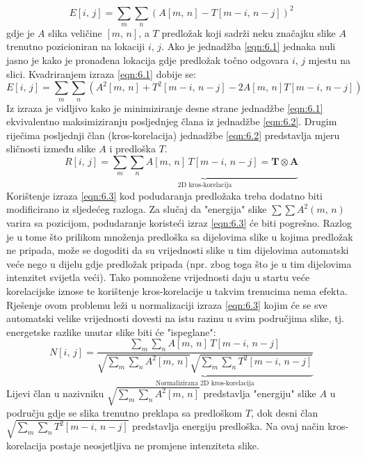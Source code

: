 \begin{equation}
	E[i,\, j] = \sum_{m}\sum_{n}\left(A[m,\, n]-T[m-i,\, n-j]\right)^{2}
	\label{eqn:6.1}
\end{equation}
gdje je $A$ slika veličine $[m,\, n]$, a $T$ predložak koji sadrži neku značajku slike $A$ trenutno pozicioniran na lokaciji $i,\, j$. Ako je jednadžba \ref{eqn:6.1} jednaka nuli jasno je kako je pronađena lokacija gdje predložak točno odgovara $i,\, j$ mjestu na slici. Kvadriranjem izraza \ref{eqn:6.1} dobije se:
\begin{equation}
	E[i,\, j] = \sum_{m}\sum_{n}\left(A^{2}[m,\, n]+T^{2}[m-i,\, n-j]-2A[m,\, n]T[m-i,\, n-j]\right)
	\label{eqn:6.2}
\end{equation}
Iz izraza je vidljivo kako je minimiziranje desne strane jednadžbe \ref{eqn:6.1} ekvivalentno maksimiziranju posljednjeg člana iz jednadžbe \ref{eqn:6.2}. Drugim riječima posljednji član (kros-korelacija) jednadžbe \ref{eqn:6.2}  predstavlja mjeru sličnosti između slike $A$ i predloška $T$.
\begin{equation}
	\boxed{R[i,\, j]=\underbrace{\sum_{m}\sum_{n}A[m,\, n]\, T[m-i,\, n-j] = \boldsymbol{T}\otimes \boldsymbol{A}}_{\text{2D kros-korelacija}}}
	\label{eqn:6.3}
\end{equation}
Korištenje izraza \ref{eqn:6.3} kod podudaranja predložaka treba dodatno biti modificirano iz sljedećeg razloga. Za slučaj da "energija" slike $\sum\sum A^{2}(m,\, n)$ varira sa pozicijom, podudaranje koristeći izraz \ref{eqn:6.3} će biti pogrešno. Razlog je u tome što prilikom množenja predloška sa dijelovima slike u kojima predložak ne pripada, može se dogoditi da su vrijednosti slike u tim dijelovima automatski veće nego u dijelu gdje predložak pripada (npr. zbog toga što je u tim dijelovima intenzitet svijetla veći). Tako pomnožene vrijednosti daju u startu veće korelacijske iznose te korištenje kros-korelacije u takvim trenucima nema efekta. Rješenje ovom problemu leži u normalizaciji izraza \ref{eqn:6.3} kojim će se sve automatski velike vrijednosti dovesti na istu razinu u svim područjima slike, tj. energetske razlike unutar slike biti će "ispeglane":
\begin{equation}
	\boxed{N[i,\, j]=\underbrace{\dfrac{\sum_{m}\sum_{n}A[m,\, n]\,T[m-i,\, n-j]}{\sqrt{\sum_{m}\sum_{n}A^{2}[m,\, n]}\sqrt{\sum_{m}\sum_{n}T^{2}[m-i,\, n-j]}}}_{\text{Normalizirana 2D kros-korelacija}}}
	\label{eqn:6.4}
\end{equation}
Lijevi član u nazivniku $\sqrt{\sum_{m}\sum_{n}A^{2}[m,\, n]}$ predstavlja "energiju" slike $A$ u području gdje se slika trenutno preklapa sa predloškom $T$, dok desni član $\sqrt{\sum_{m}\sum_{n}T^{2}[m-i,\, n-j]}$ predstavlja energiju predloška. Na ovaj način kros-korelacija postaje neosjetljiva ne promjene intenziteta slike. \\
